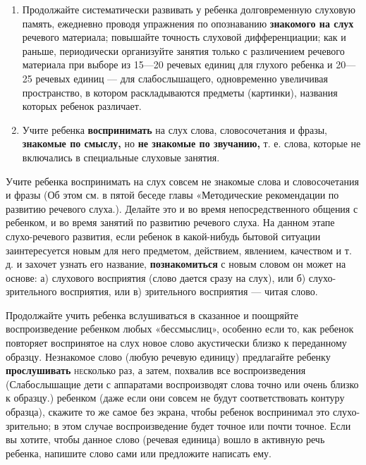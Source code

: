 \documentclass[a5paper]{book}
\begin{document}
\begin{enumerate}
\def\labelenumi{\arabic{enumi}.}
\setcounter{enumi}{1}
\item
  
  Продолжайте систематически развивать у ребенка долговременную слуховую
  память, ежедневно проводя упражнения по опознаванию \textbf{знакомого
  на слух} речевого материала; повышайте точность слуховой
  дифференциации; как и раньше, периодически организуйте занятия только
  с различением речевого материала при выборе из 15---20 речевых единиц
  для глухого ребенка и 20---25 речевых единиц --- для слабослышащего,
  одновременно увеличивая пространство, в котором раскладываются
  предметы (картинки), названия которых ребенок различает.
  
\item
  
  Учите ребенка \textbf{воспринимать} на слух слова, словосочетания и
  фразы, \textbf{знакомые по смыслу,} но \textbf{не знакомые по
  звучанию,} т. е. слова, которые не включались в специальные слуховые
  занятия.
  
\end{enumerate}


Учите ребенка воспринимать на слух совсем не знакомые слова и
словосочетания и фразы (Об этом см. в пятой беседе главы «Методические
рекомендации по развитию речевого слуха.). Делайте это и во время
непосредственного общения с ребенком, и во время занятий по развитию
речевого слуха. На данном этапе слухо-речевого развития, если ребенок в
какой-нибудь бытовой ситуации заинтересуется новым для него предметом,
действием, явлением, качеством и т. д. и захочет узнать его название,
\textbf{познакомиться} с новым словом он может на основе: а) слухового
восприятия (слово дается сразу на слух), или б) слухо-зрительного
восприятия, или в) зрительного восприятия --- читая слово.

Продолжайте учить ребенка вслушиваться в сказанное и поощряйте
воспроизведение ребенком любых «бессмыслиц», особенно если то, как
ребенок повторяет воспринятое на слух новое слово акустически близко к
переданному образцу. Незнакомое слово (любую речевую единицу)
предлагайте ребенку \textbf{прослушивать} \textsc{не}сколько раз, а
затем, похвалив все воспроизведения (Слабослышащие дети с аппаратами
воспроизводят слова точно или очень близко к образцу.) ребенком (даже
если они совсем не будут соответствовать контуру образца), скажите то же
самое без экрана, чтобы ребенок воспринимал это слухо-зрительно; в этом
случае воспроизведение будет точное или почти точное. Если вы хотите,
чтобы данное слово (речевая единица) вошло в активную речь ребенка,
напишите слово сами или предложите написать ему.
\end{document}
